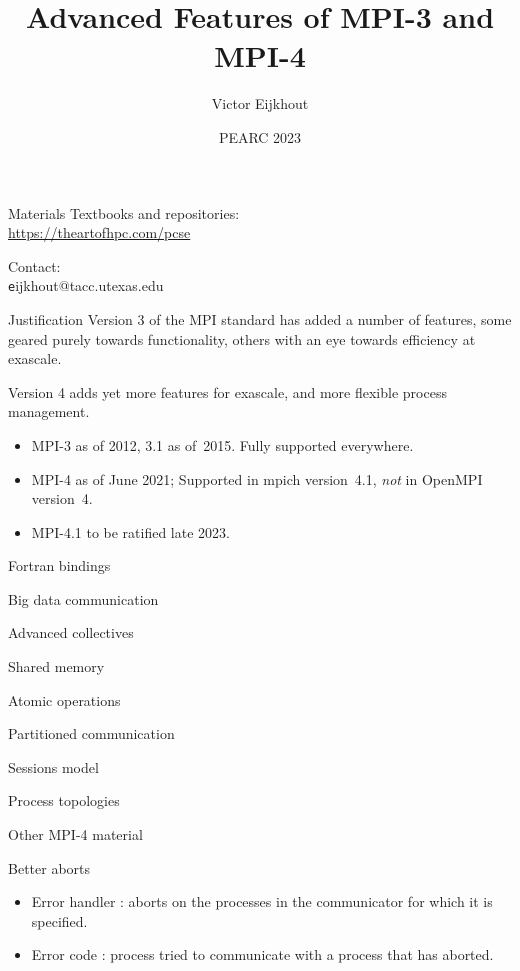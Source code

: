 \documentclass[10pt]{beamer}
\begin{document}
\title[MPI 3\&4]{Advanced Features of MPI-3 and MPI-4}
\author[Eijkhout]{Victor Eijkhout}
\date{PEARC 2023}

\maketitle

\begin{frame}[containsverbatim]{Materials}
  Textbooks and repositories:\\
  \url{https://theartofhpc.com/pcse}

  Contact:\\
  {\texttt eijkhout@tacc.utexas.edu}
\end{frame}

\begin{frame}{Justification}
  Version 3 of the MPI standard has added a number
  of features, some geared purely towards functionality,
  others with an eye towards efficiency at exascale.

  Version 4 adds yet more features for exascale,
  and more flexible process management.

  \begin{itemize}
  \item
    MPI-3 as of 2012, 3.1 as of~2015. Fully supported everywhere.\\
  \item 
    MPI-4 as of June 2021;
    Supported in mpich version~4.1, \emph{not} in OpenMPI version~4.
  \item MPI-4.1 to be ratified late 2023.
  \end{itemize}
\end{frame}

 {Fortran bindings}


 {Big data communication}


 {Advanced collectives}


 {Shared memory}


 {Atomic operations}

 
 {Partitioned communication}


 {Sessions model}


 {Process topologies}


 {Other MPI-4 material}

\begin{numberedframe}{Better aborts}
  \begin{itemize}
  \item Error handler
     :
     aborts on the processes in the communicator for which it is specified.
  \item
    Error code :
    process tried to communicate
    with a process that has aborted.
  \end{itemize}

\end{numberedframe}
\end{document}
